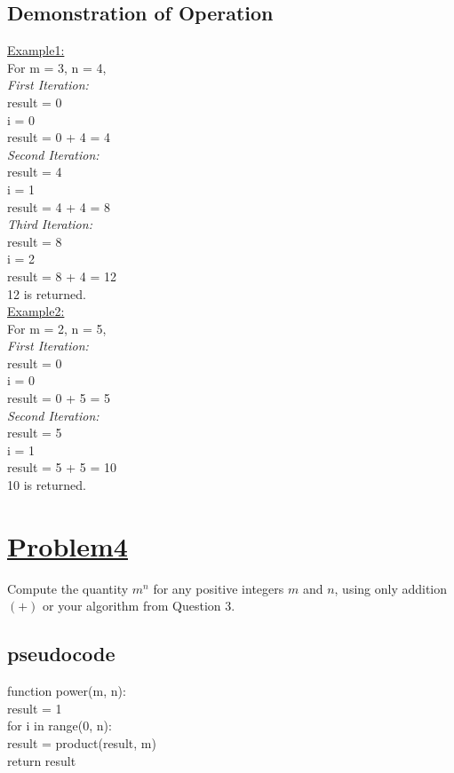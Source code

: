 \documentclass[a4paper,12pt]{article}
\begin{document}
    \subsection{Demonstration of Operation}
    \underline{Example1:}\\
    For m = 3, n = 4,\\
    \textit{First Iteration:}\\
    result = 0\\
    i = 0\\
    result = 0 + 4 = 4\\
    \textit{Second Iteration:}\\
    result = 4\\
    i = 1\\
    result = 4 + 4 = 8\\
    \textit{Third Iteration:}\\
    result = 8\\
    i = 2\\
    result = 8 + 4 = 12\\
    12 is returned.\\
    \underline{Example2:}\\
    For m = 2, n = 5,\\
    \textit{First Iteration:}\\
    result = 0\\
    i = 0\\
    result = 0 + 5 = 5\\
    \textit{Second Iteration:}\\
    result = 5\\
    i = 1\\
    result = 5 + 5 = 10\\
    10 is returned.


    \section{\underline{\underline{Problem4}}}
    Compute the quantity $m^n$ for any positive integers $m$ and $n$, using
    only addition $(+)$ or your algorithm from Question 3.
    \subsection{pseudocode}
    \begin{tabbing}
        function power(m, n):\\
    \hspace{1em}result = 1\\
    \hspace{1em}for i in range(0, n):\\
    \hspace{2em}result = product(result, m)\\
    \hspace{1em}return result
    \end{tabbing}
\end{document}
